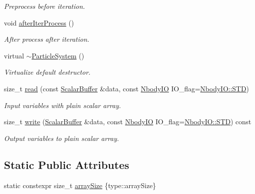 \begin{DoxyCompactItemize}
\begin{DoxyCompactList}\small\item\em Preprocess before iteration. \end{DoxyCompactList}\item 
void \mbox{\hyperlink{class_space_h_1_1_particle_system_af31e35ad97bedb42ab85c107f1277004}{after\+Iter\+Process}} ()
\begin{DoxyCompactList}\small\item\em After process after iteration. \end{DoxyCompactList}\item 
virtual \mbox{\hyperlink{class_space_h_1_1_particle_system_a897e72dbf619c8a235121e195bc7edde}{$\sim$\+Particle\+System}} ()
\begin{DoxyCompactList}\small\item\em Virtualize default destructor. \end{DoxyCompactList}\item 
size\+\_\+t \mbox{\hyperlink{class_space_h_1_1_particle_system_af8c8bbae833f6031b1b55a66aafa0475}{read}} (const \mbox{\hyperlink{class_space_h_1_1_particle_system_a71f8e04a3c8adc44b2a8b41e0cd55278}{Scalar\+Buffer}} \&data, const \mbox{\hyperlink{namespace_space_h_a296a8bae763a754564bfdce216e31b59}{Nbody\+IO}} I\+O\+\_\+flag=\mbox{\hyperlink{namespace_space_h_a296a8bae763a754564bfdce216e31b59ac6ce23be5d350ce18a665427d2d950f7}{Nbody\+I\+O\+::\+S\+TD}})
\begin{DoxyCompactList}\small\item\em Input variables with plain scalar array. \end{DoxyCompactList}\item 
size\+\_\+t \mbox{\hyperlink{class_space_h_1_1_particle_system_af662bb9620680baa12c67f8901c42f90}{write}} (\mbox{\hyperlink{class_space_h_1_1_particle_system_a71f8e04a3c8adc44b2a8b41e0cd55278}{Scalar\+Buffer}} \&data, const \mbox{\hyperlink{namespace_space_h_a296a8bae763a754564bfdce216e31b59}{Nbody\+IO}} I\+O\+\_\+flag=\mbox{\hyperlink{namespace_space_h_a296a8bae763a754564bfdce216e31b59ac6ce23be5d350ce18a665427d2d950f7}{Nbody\+I\+O\+::\+S\+TD}}) const
\begin{DoxyCompactList}\small\item\em Output variables to plain scalar array. \end{DoxyCompactList}\end{DoxyCompactItemize}
\subsection*{Static Public Attributes}
\begin{DoxyCompactItemize}
\item 
static constexpr size\+\_\+t \mbox{\hyperlink{class_space_h_1_1_particle_system_a63bedef5e42ff18291a6c7c231decf24}{array\+Size}} \{type\+::array\+Size\}
\end{DoxyCompactItemize}
